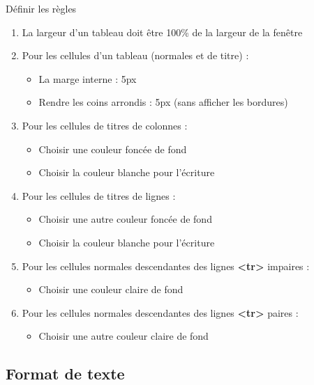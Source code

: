 \documentclass[11pt, a4paper]{article}
\begin{document}
Définir les règles 
\begin{enumerate}
	\item La largeur d'un tableau doit être 100\% de la largeur de la fenêtre
	\item Pour les cellules d'un tableau (normales et de titre) :
	\begin{multicols}{2}
	\begin{itemize}
		\item La marge interne : 5px
		\item Rendre les coins arrondis : 5px (sans afficher les bordures)
	\end{itemize} 
	\end{multicols}
	\item Pour les cellules de titres de colonnes :
	\begin{multicols}{2}
	\begin{itemize}
		\item Choisir une couleur foncée de fond
		\item Choisir la couleur blanche pour l'écriture
	\end{itemize}  
	\end{multicols}
	\item Pour les cellules de titres de lignes :
	\begin{multicols}{2}
	\begin{itemize}
		\item Choisir une autre couleur foncée de fond
		\item Choisir la couleur blanche pour l'écriture
	\end{itemize} 
	\end{multicols}
	\item Pour les cellules normales descendantes des lignes \textbf{<tr>} impaires :
	\begin{itemize}
		\item Choisir une couleur claire de fond
	\end{itemize} 
	\item Pour les cellules normales descendantes des lignes \textbf{<tr>} paires :
	\begin{itemize}
		\item Choisir une autre couleur claire de fond
	\end{itemize} 
\end{enumerate}

\subsection*{Format de texte}
\end{document}
